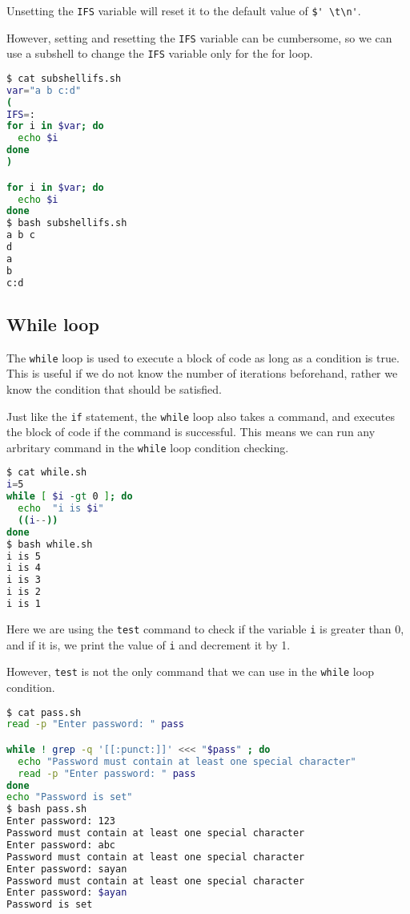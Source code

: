 Unsetting the \lstinline|IFS| variable will reset it to the default value of \lstinline|$' \t\n'|.

However, setting and resetting the \lstinline|IFS| variable can be cumbersome, so we can use a subshell to change the \lstinline|IFS| variable only for the for loop.

\begin{lstlisting}[language=bash]
$ cat subshellifs.sh
var="a b c:d"
(
IFS=:
for i in $var; do
  echo $i
done
)

for i in $var; do
  echo $i
done
$ bash subshellifs.sh
a b c
d
a
b
c:d
\end{lstlisting}

\subsection{While loop}

The \lstinline{while} loop is used to execute a block of code as long as a condition is true.
This is useful if we do not know the number of iterations beforehand, rather we know the condition that should be satisfied.

Just like the \lstinline{if} statement, the \lstinline{while} loop also takes a command, and executes the block of code if the command is successful.
This means we can run any arbritary command in the \lstinline{while} loop condition checking.

\begin{lstlisting}[language=bash]
$ cat while.sh
i=5
while [ $i -gt 0 ]; do
  echo  "i is $i"
  ((i--))
done
$ bash while.sh
i is 5
i is 4
i is 3
i is 2
i is 1
\end{lstlisting}

Here we are using the \lstinline|test| command to check if the variable \lstinline|i| is greater than 0, and if it is, we print the value of \lstinline|i| and decrement it by 1.

However, \lstinline|test| is not the only command that we can use in the \lstinline{while} loop condition.

\begin{lstlisting}[language=bash]
$ cat pass.sh
read -p "Enter password: " pass

while ! grep -q '[[:punct:]]' <<< "$pass" ; do
  echo "Password must contain at least one special character"
  read -p "Enter password: " pass
done
echo "Password is set"
$ bash pass.sh
Enter password: 123
Password must contain at least one special character
Enter password: abc
Password must contain at least one special character
Enter password: sayan
Password must contain at least one special character
Enter password: $ayan
Password is set
\end{lstlisting}

